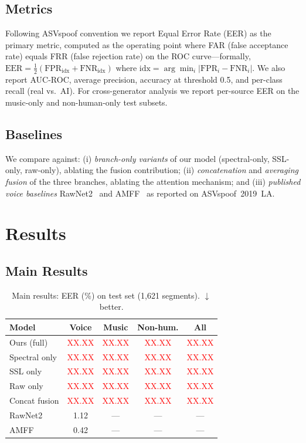 \documentclass[10pt,twocolumn,a4paper]{article}
\newcommand{\NUM}{\textcolor{red}{XX.XX}}
\begin{document}
\subsection{Metrics}

Following ASVspoof convention we report Equal Error Rate (EER) as the primary metric, computed as the operating point where FAR (false acceptance rate) equals FRR (false rejection rate) on the ROC curve---formally, $\text{EER} = \tfrac{1}{2}(\text{FPR}_{\text{idx}} + \text{FNR}_{\text{idx}})$ where $\text{idx} = \arg\min_{i} |\text{FPR}_i - \text{FNR}_i|$. We also report AUC-ROC, average precision, accuracy at threshold 0.5, and per-class recall (real vs.\ AI). For cross-generator analysis we report per-source EER on the music-only and non-human-only test subsets.

\subsection{Baselines}

We compare against: (i) \textit{branch-only variants} of our model (spectral-only, SSL-only, raw-only), ablating the fusion contribution; (ii) \textit{concatenation} and \textit{averaging fusion} of the three branches, ablating the attention mechanism; and (iii) \textit{published voice baselines} RawNet2~\cite{rawnet2} and AMFF~\cite{amff_nexttdnn_2025} as reported on ASVspoof~2019~LA.

\section{Results}
\label{sec:results}

\subsection{Main Results}

\begin{table}[t]
\centering
\caption{Main results: EER (\%) on test set (1,621 segments). $\downarrow$ better.}
\label{tab:main}
\small
\begin{tabular}{@{}lcccc@{}}
\toprule
\textbf{Model} & \textbf{Voice} & \textbf{Music} & \textbf{Non-hum.} & \textbf{All} \\
\midrule
Ours (full) & \NUM & \NUM & \NUM & \NUM \\
Spectral only & \NUM & \NUM & \NUM & \NUM \\
SSL only & \NUM & \NUM & \NUM & \NUM \\
Raw only & \NUM & \NUM & \NUM & \NUM \\
Concat fusion & \NUM & \NUM & \NUM & \NUM \\
\midrule
RawNet2~\cite{rawnet2} & 1.12 & --- & --- & --- \\
AMFF~\cite{amff_nexttdnn_2025} & 0.42 & --- & --- & --- \\
\bottomrule
\end{tabular}
\end{table}
\end{document}

